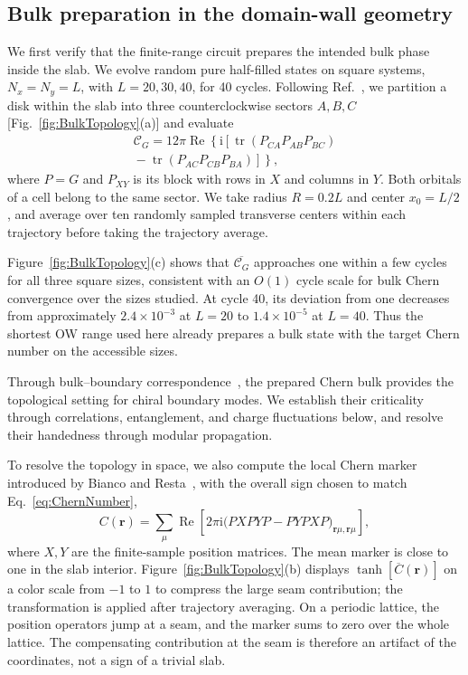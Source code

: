 \documentclass[aps,prb,10pt,twocolumn,superscriptaddress,longbibliography,floatfix]{revtex4-2}
\newcommand{\ii}{\mathrm{i}}
\newcommand{\mc}[1]{\mathcal{#1}}
\newcommand{\bfr}{\boldsymbol r}
\newcommand{\claudeadd}[1]{{\color{orange}#1}}
\begin{document}
{\color{blue}
\subsection{Bulk preparation in the domain-wall geometry}
\label{sec:BulkTopology}

We first verify that the finite-range circuit prepares the intended bulk phase inside the slab. We evolve random pure half-filled states on square systems, $N_x=N_y=L$, with $L=20,30,40$, for 40 cycles. Following Ref.~\cite{Kitaev2006}, we partition a disk within the slab into three counterclockwise sectors $A,B,C$ [Fig.~\ref{fig:BulkTopology}(a)] and evaluate
\begin{align}
    \mc C_G=12\pi\operatorname{Re}\!\left\{\ii\left[\operatorname{tr}(P_{CA}P_{AB}P_{BC})\right.\right.\nonumber\\
    \left.\left.{}-\operatorname{tr}(P_{AC}P_{CB}P_{BA})\right]\right\},
    \label{eq:KitaevChern}
\end{align}
where \claudeadd{$P=G$} and $P_{XY}$ is its block with rows in $X$ and columns in $Y$. Both orbitals of a cell belong to the same sector. We take radius $R=0.2L$ and center $x_0=L/2$, and average over ten randomly sampled transverse centers within each trajectory before taking the trajectory average.

Figure~\ref{fig:BulkTopology}(c) shows that $\overline{\mc C_G}$ approaches one within a few cycles for all three square sizes, consistent with an $O(1)$ cycle scale for bulk Chern convergence over the sizes studied. At cycle 40, its deviation from one decreases from approximately $2.4\times10^{-3}$ at $L=20$ to $1.4\times10^{-5}$ at $L=40$. Thus the shortest OW range used here already prepares a bulk state with the target Chern number on the accessible sizes.

Through bulk--boundary correspondence~\cite{Hatsugai1993}, the prepared Chern bulk provides the topological setting for chiral boundary modes. We establish their criticality through correlations, entanglement, and charge fluctuations below, and resolve their handedness through modular propagation.

To resolve the topology in space, we also compute the local Chern marker introduced by Bianco and Resta~\cite{BiancoResta2011}, with the overall sign chosen to match Eq.~\eqref{eq:ChernNumber},
\begin{equation}
 C(\bfr)=\sum_\mu\operatorname{Re}\!\left[2\pi\ii\big(PXPYP-PYPXP\big)_{\bfr\mu,\bfr\mu}\right],
 \label{eq:LocalMarker}
\end{equation}
where $X,Y$ are the finite-sample position matrices. The mean marker is close to one in the slab interior. Figure~\ref{fig:BulkTopology}(b) displays $\tanh[\overline{C}(\bfr)]$ on a color scale from $-1$ to $1$ to compress the large seam contribution; the transformation is applied after trajectory averaging. \claudeadd{On a periodic lattice, the position operators jump at a seam, and the marker sums to zero over the whole lattice. The compensating contribution at the seam is therefore an artifact of the coordinates, not a sign of a trivial slab.}
}
\end{document}
